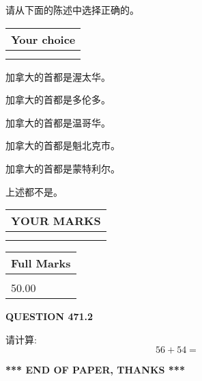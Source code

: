 \documentclass{ctexart}
\begin{document}
  
请从下面的陈述中选择正确的。
  
  
\noindent\hspace{3.0in} \begin{tabular}{|l|}
\hline
Your choice \\
\hline
 \\ 
 \\ 
\hline
\end{tabular}
  
  
 
 
加拿大的首都是渥太华。
 
 
加拿大的首都是多伦多。
 
 
加拿大的首都是温哥华。
 
 
加拿大的首都是魁北克市。
 
 
加拿大的首都是蒙特利尔。
 
 
 上述都不是。
 
 
  
\vspace{0.2in}
  
\noindent\begin{tabular}{|l|}
\hline
 YOUR MARKS  \\
\hline
 \\ 
 \\ 
\hline
\end{tabular}
\hspace{0.05in} \begin{tabular}{|l|}
\hline
 Full Marks  \\
\hline
 \\ 
50.00 \\
\hline
\end{tabular}
{\textbf{\Large{QUESTION
471.2 
}}}
  
  
 
请计算:
\begin{equation}
56 +  %
54 = \nonumber
\end{equation}
 

 

 
   
   
 \vspace{0.2in}
 
   
   
   
   
\vspace{1.0in} 
{\textbf{\large{ *** END OF PAPER, THANKS *** }}} 
   
\end{document}
